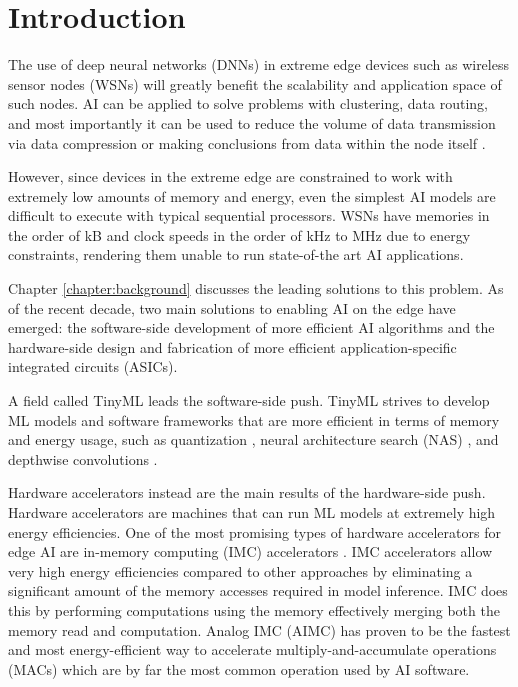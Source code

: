 \chapter{Introduction}

The use of deep neural networks (DNNs) in extreme edge devices such as wireless sensor nodes (WSNs) will greatly benefit the scalability and application space of such nodes. AI can be applied to solve problems with clustering, data routing, and most importantly it can be used to reduce the volume of data transmission via data compression or making conclusions from data within the node itself \cite{alsheikh2014machine}.

However, since devices in the extreme edge are constrained to work with extremely low amounts of memory and energy, even the simplest AI models are difficult to execute with typical sequential processors. WSNs have memories in the order of kB and clock speeds in the order of kHz to MHz due to energy constraints, rendering them unable to run state-of-the art AI applications.

Chapter \ref{chapter:background} discusses the leading solutions to this problem. As of the recent decade, two main solutions to enabling AI on the edge have emerged: the software-side development of more efficient AI algorithms and the hardware-side design and fabrication of more efficient application-specific integrated circuits (ASICs). 

A field called TinyML leads the software-side push. TinyML strives to develop ML models and software frameworks that are more efficient in terms of memory and energy usage, such as quantization \cite{jacob2018quantization}, neural architecture search (NAS) \cite{lin2020mcunet}, and depthwise convolutions \cite{sandler2018mobilenetv2}. 

Hardware accelerators instead are the main results of the hardware-side push. Hardware accelerators are machines  that can run ML models at extremely high energy efficiencies. One of the most promising types of hardware accelerators for edge AI are in-memory computing (IMC) accelerators \cite{sebastian2020memory}. IMC accelerators allow very high energy efficiencies compared to other approaches by eliminating a significant amount of the memory accesses required in model inference.  IMC does this by performing computations using the memory effectively merging both the memory read and computation. Analog IMC (AIMC) has proven to be the fastest and most energy-efficient way to accelerate multiply-and-accumulate operations (MACs) which are by far the most common operation used by AI software.

